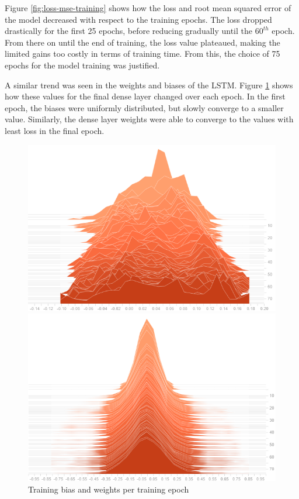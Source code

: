 Figure \ref{fig:loss-mse-training} shows how the loss and root mean squared error of the model decreased with respect to the training epochs. The loss dropped drastically for the first 25 epochs, before reducing gradually until the $60^{th}$ epoch. From there on until the end of training, the loss value plateaued, making the limited gains too costly in terms of training time. From this, the choice of 75 epochs for the model training was justified.\par

A similar trend was seen in the weights and biases of the LSTM. Figure \ref{fig:bias-weight-training} shows how these values for the final dense layer changed over each epoch. In the first epoch, the biases were uniformly distributed, but slowly converge to a smaller value. Similarly, the dense layer weights were able to converge to the values with least loss in the final epoch.\par

\begin{figure}[htb]
    \centering
    \caption{Training bias and weights per training epoch}
    \label{fig:bias-weight-training}
    \begin{minipage}{0.45\linewidth}
        \includegraphics[width=1.0\linewidth]{Figures/LSTM-Bias.png}
    \end{minipage}\hfill
    \begin{minipage}{0.45\linewidth}
        \includegraphics[width=1.0\linewidth]{Figures/LSTM-Weights.png}
    \end{minipage}
\end{figure}

